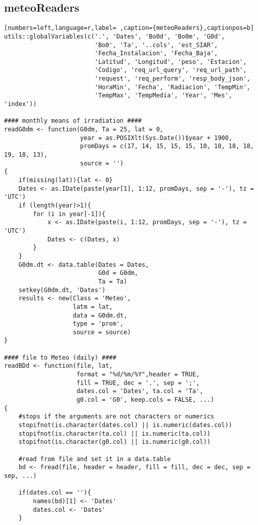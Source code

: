 \subsection{meteoReaders}
\label{sec:org5d7b7be}
\label{subsec:meteoreaders}
\begin{lstlisting}[numbers=left,language=r,label= ,caption={meteoReaders},captionpos=b]
utils::globalVariables(c('.', 'Dates', 'Bo0d', 'Bo0m', 'G0d',
                         'Bo0', 'Ta', '..cols', 'est_SIAR',
                         'Fecha_Instalacion', 'Fecha_Baja',
                         'Latitud', 'Longitud', 'peso', 'Estacion',
                         'Codigo', 'req_url_query', 'req_url_path',
                         'request', 'req_perform', 'resp_body_json',
                         'HoraMin', 'Fecha', 'Radiacion', 'TempMin',
                         'TempMax', 'TempMedia', 'Year', 'Mes', 'index'))

#### monthly means of irradiation ####
readG0dm <- function(G0dm, Ta = 25, lat = 0,
                     year = as.POSIXlt(Sys.Date())$year + 1900,
                     promDays = c(17, 14, 15, 15, 15, 10, 18, 18, 18, 19, 18, 13),
                     source = '')
{
    if(missing(lat)){lat <- 0}
    Dates <- as.IDate(paste(year[1], 1:12, promDays, sep = '-'), tz = 'UTC')
    if (length(year)>1){
        for (i in year[-1]){
            x <- as.IDate(paste(i, 1:12, promDays, sep = '-'), tz = 'UTC')
            Dates <- c(Dates, x)
        }
    }
    G0dm.dt <- data.table(Dates = Dates,
                          G0d = G0dm,
                          Ta = Ta)
    setkey(G0dm.dt, 'Dates')
    results <- new(Class = 'Meteo',
                   latm = lat,
                   data = G0dm.dt,
                   type = 'prom',
                   source = source)
}

#### file to Meteo (daily) ####
readBDd <- function(file, lat,
                    format = "%d/%m/%Y",header = TRUE,
                    fill = TRUE, dec = '.', sep = ';',
                    dates.col = 'Dates', ta.col = 'Ta',
                    g0.col = 'G0', keep.cols = FALSE, ...)
{
    #stops if the arguments are not characters or numerics
    stopifnot(is.character(dates.col) || is.numeric(dates.col))
    stopifnot(is.character(ta.col) || is.numeric(ta.col))
    stopifnot(is.character(g0.col) || is.numeric(g0.col))

    #read from file and set it in a data.table
    bd <- fread(file, header = header, fill = fill, dec = dec, sep = sep, ...)

    if(dates.col == ''){
        names(bd)[1] <- 'Dates'
        dates.col <- 'Dates'
    }


\end{lstlisting}
